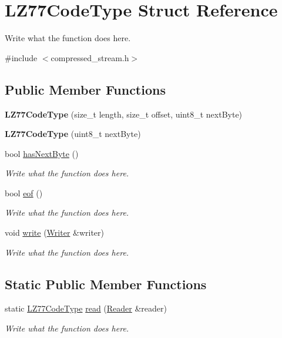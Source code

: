 \hypertarget{structLZ77CodeType}{\section{L\+Z77\+Code\+Type Struct Reference}
\label{structLZ77CodeType}
}


Write what the function does here.  




{\ttfamily \#include $<$compressed\+\_\+stream.\+h$>$}

\subsection*{Public Member Functions}
\begin{DoxyCompactItemize}
\item 
\hypertarget{structLZ77CodeType_a3f8c29e5f88aff1053705e5a651a443f}{{\bfseries L\+Z77\+Code\+Type} (size\+\_\+t length, size\+\_\+t offset, uint8\+\_\+t next\+Byte)}\label{structLZ77CodeType_a3f8c29e5f88aff1053705e5a651a443f}

\item 
\hypertarget{structLZ77CodeType_a008eb3e8953c86bf3ae044c6824321cc}{{\bfseries L\+Z77\+Code\+Type} (uint8\+\_\+t next\+Byte)}\label{structLZ77CodeType_a008eb3e8953c86bf3ae044c6824321cc}

\item 
bool \hyperlink{structLZ77CodeType_a36290b0883b9280e74fab0f2a051bdd6}{has\+Next\+Byte} ()
\begin{DoxyCompactList}\small\item\em Write what the function does here. \end{DoxyCompactList}\item 
bool \hyperlink{structLZ77CodeType_a7277c9ee60156ee1b577d9b30cac3402}{eof} ()
\begin{DoxyCompactList}\small\item\em Write what the function does here. \end{DoxyCompactList}\item 
void \hyperlink{structLZ77CodeType_adf2ddd7196f0b8a4e60cddfccb60795c}{write} (\hyperlink{classWriter}{Writer} \&writer)
\begin{DoxyCompactList}\small\item\em Write what the function does here. \end{DoxyCompactList}\end{DoxyCompactItemize}
\subsection*{Static Public Member Functions}
\begin{DoxyCompactItemize}
\item 
static \hyperlink{structLZ77CodeType}{L\+Z77\+Code\+Type} \hyperlink{structLZ77CodeType_a81a3dc5f81b7ab0f7fc8ddfe80dca56f}{read} (\hyperlink{classReader}{Reader} \&reader)
\begin{DoxyCompactList}\small\item\em Write what the function does here. \end{DoxyCompactList}\end{DoxyCompactItemize}
